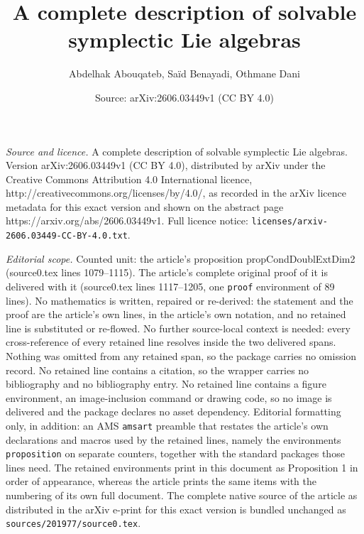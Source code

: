\documentclass[10pt,a4paper]{amsart}
\title{A complete description of solvable symplectic Lie algebras}
\author{Abdelhak Abouqateb, Sa\"id Benayadi, Othmane Dani}
\date{Source: arXiv:2606.03449v1 (CC BY 4.0)}
\begin{document}
\maketitle

\noindent\emph{Source and licence.} A complete description of solvable symplectic Lie algebras. Version arXiv:2606.03449v1 (CC BY 4.0), distributed by arXiv under the Creative Commons Attribution 4.0 International licence, http://creativecommons.org/licenses/by/4.0/, as recorded in the arXiv licence metadata for this exact version and shown on the abstract page https://arxiv.org/abs/2606.03449v1. Full licence notice: \texttt{licenses/arxiv-2606.03449-CC-BY-4.0.txt}.\par\smallskip

\noindent\textit{Editorial scope.} Counted unit: the article's proposition propCondDoublExtDim2 (source0.tex lines 1079--1115). The article's complete original proof of it is delivered with it (source0.tex lines 1117--1205, one \texttt{proof} environment of 89 lines). No mathematics is written, repaired or re-derived: the statement and the proof are the article's own lines, in the article's own notation, and no retained line is substituted or re-flowed.  No further source-local context is needed: every cross-reference of every retained line resolves inside the two delivered spans.  Nothing was omitted from any retained span, so the package carries no omission record.  No retained line contains a citation, so the wrapper carries no bibliography and no bibliography entry.  No retained line contains a figure environment, an image-inclusion command or drawing code, so no image is delivered and the package declares no asset dependency.  Editorial formatting only, in addition: an AMS \texttt{amsart} preamble that restates the article's own declarations and macros used by the retained lines, namely the environments \texttt{proposition} on separate counters, together with the standard packages those lines need.  The retained environments print in this document as Proposition 1 in order of appearance, whereas the article prints the same items with the numbering of its own full document.  The complete native source of the article as distributed in the arXiv e-print for this exact version is bundled unchanged as \texttt{sources/201977/source0.tex}.
\end{document}
